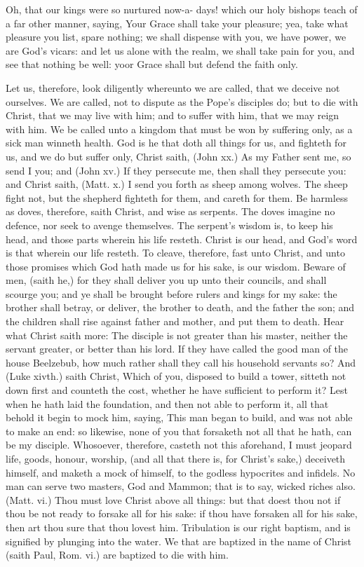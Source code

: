 Oh, that our kings were so nurtured now-a- 
days! which our holy bishops teach of a far 
other manner, saying, Your Grace shall take 
your pleasure; yea, take what pleasure you list, 
spare nothing; we shall dispense with you, we 
have power, we are God's vicars: and let us 
alone with the realm, we shall take pain for you, 
and see that nothing be well: yoor Grace shall 
but defend the faith only. 

Let us, therefore, look diligently whereunto 
we are called, that we deceive not ourselves. 
We are called, not to dispute as the Pope's disciples
do; but to die with Christ, that we may 
live with him; and to suffer with him, that we 
may reign with him. We be called unto a kingdom
that must be won by suffering only, as a 
sick man winneth health. God is he that doth all 
things for us, and fighteth for us, and we do but 
suffer only, Christ saith, (John xx.) As my Father 
sent me, so send I you; and (John xv.) If they 
persecute me, then shall they persecute you:
and Christ saith, (Matt. x.) I send you forth as 
sheep among wolves. The sheep fight not, but 
the shepherd fighteth for them, and careth for 
them. Be harmless as doves, therefore, saith 
Christ, and wise as serpents. The doves imagine
no defence, nor seek to avenge themselves.
The serpent's wisdom is, to keep his 
head, and those parts wherein his life resteth.
Christ is our head, and God's word is that 
wherein our life resteth. To cleave, therefore, 
fast unto Christ, and unto those promises which 
God hath made us for his sake, is our wisdom. 
Beware of men, (saith he,) for they shall deliver 
you up unto their councils, and shall scourge 
you; and ye shall be brought before rulers and 
kings for my sake: the brother shall betray, or 
deliver, the brother to death, and the father the 
son; and the children shall rise against father 
and mother, and put them to death. Hear what 
Christ saith more: The disciple is not greater 
than his master, neither the servant greater, or 
better than his lord. If they have called the 
good man of the house Beelzebub, how much 
rather shall they call his household servants so? 
And (Luke xivth.) saith Christ, Which of you, 
disposed to build a tower, sitteth not down first 
and counteth the cost, whether he have sufficient 
to perform it? Lest when he hath laid the foundation,
and then not able to perform it, all that 
behold it begin to mock him, saying, This man 
began to build, and was not able to make an 
end: so likewise, none of you that forsaketh not 
all that he hath, can be my disciple. Whosoever,
therefore, casteth not this aforehand, I must 
jeopard life, goods, honour, worship, (and all 
that there is, for Christ's sake,) deceiveth himself,
and maketh a mock of himself, to the godless
hypocrites and infidels. No man can serve 
two masters, God and Mammon; that is to say, 
wicked riches also. (Matt. vi.) Thou must love 
Christ above all things: but that doest thou 
not if thou be not ready to forsake all for his 
sake: if thou have forsaken all for his sake, then 
art thou sure that thou lovest him. Tribulation
is our right baptism, and is signified by plunging 
into the water. We that are baptized in the 
name of Christ (saith Paul, Rom. vi.) are baptized
to die with him. 

